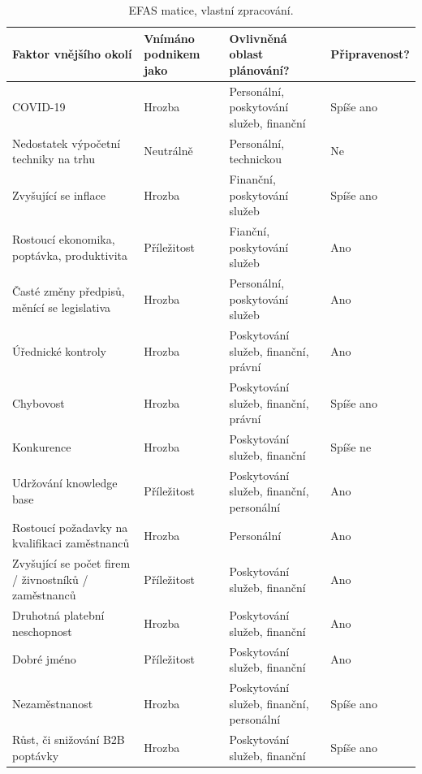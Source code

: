 \begin{table}[!hbtp]
\centering
\begin{tabularx}{\textwidth}{|X|X|X|X|}
\hline
Faktor vnějšího okolí & Vnímáno podnikem jako & Ovlivněná oblast plánování? & Připravenost? \\ \hline
COVID-19 & Hrozba & Personální, poskytování služeb, finanční & Spíše ano \\ \hline
Nedostatek výpočetní techniky na trhu & Neutrálně & Personální, technickou & Ne \\ \hline
Zvyšující se inflace & Hrozba & Finanční, poskytování služeb & Spíše ano \\ \hline
Rostoucí ekonomika, poptávka, produktivita & Příležitost & Fianční, poskytování služeb & Ano \\ \hline
Časté změny předpisů, měnící se legislativa & Hrozba & Personální, poskytování služeb & Ano \\ \hline
Úřednické kontroly & Hrozba & Poskytování služeb, finanční, právní & Ano \\ \hline
Chybovost & Hrozba & Poskytování služeb, finanční, právní & Spíše ano \\ \hline
Konkurence & Hrozba & Poskytování služeb, finanční & Spíše ne \\ \hline
Udržování knowledge base & Příležitost & Poskytování služeb, finanční, personální & Ano \\ \hline
Rostoucí požadavky na kvalifikaci zaměstnanců & Hrozba & Personální & Ano \\ \hline
Zvyšující se počet firem / živnostníků / zaměstnanců & Příležitost & Poskytování služeb, finanční & Ano \\ \hline
Druhotná platební neschopnost & Hrozba & Poskytování služeb, finanční & Ano \\ \hline
Dobré jméno & Příležitost & Poskytování služeb, finanční & Ano \\ \hline
Nezaměstnanost & Hrozba & Poskytování služeb, finanční, personální & Spíše ano \\ \hline
Růst, či snižování B2B poptávky & Hrozba & Poskytování služeb, finanční & Spíše ano \\ \hline
\end{tabularx}
\caption[EFAS matice]{EFAS matice, vlastní zpracování.}
\label{tab:EFAS matice}
\end{table}

